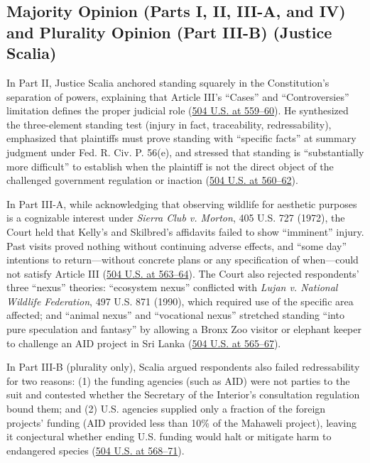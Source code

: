 \documentclass[12pt]{article}
\begin{document}
\subsection{Majority Opinion (Parts I, II, III-A, and IV) and Plurality Opinion (Part III-B) (Justice Scalia)}
In Part II, Justice Scalia anchored standing squarely in the Constitution's separation of powers, explaining that Article III's ``Cases'' and ``Controversies'' limitation defines the proper judicial role (\href{https://supreme.justia.com/cases/federal/us/504/555/}{504 U.S. at 559--60}). He synthesized the three-element standing test (injury in fact, traceability, redressability), emphasized that plaintiffs must prove standing with ``specific facts'' at summary judgment under Fed. R. Civ. P. 56(e), and stressed that standing is ``substantially more difficult'' to establish when the plaintiff is not the direct object of the challenged government regulation or inaction (\href{https://supreme.justia.com/cases/federal/us/504/555/}{504 U.S. at 560--62}).

In Part III-A, while acknowledging that observing wildlife for aesthetic purposes is a cognizable interest under \textit{Sierra Club v. Morton}, 405 U.S. 727 (1972), the Court held that Kelly's and Skilbred's affidavits failed to show ``imminent'' injury. Past visits proved nothing without continuing adverse effects, and ``some day'' intentions to return---without concrete plans or any specification of when---could not satisfy Article III (\href{https://supreme.justia.com/cases/federal/us/504/555/}{504 U.S. at 563--64}). The Court also rejected respondents' three ``nexus'' theories: ``ecosystem nexus'' conflicted with \textit{Lujan v. National Wildlife Federation}, 497 U.S. 871 (1990), which required use of the specific area affected; and ``animal nexus'' and ``vocational nexus'' stretched standing ``into pure speculation and fantasy'' by allowing a Bronx Zoo visitor or elephant keeper to challenge an AID project in Sri Lanka (\href{https://supreme.justia.com/cases/federal/us/504/555/}{504 U.S. at 565--67}).

In Part III-B (plurality only), Scalia argued respondents also failed redressability for two reasons: (1) the funding agencies (such as AID) were not parties to the suit and contested whether the Secretary of the Interior's consultation regulation bound them; and (2) U.S. agencies supplied only a fraction of the foreign projects' funding (AID provided less than 10\% of the Mahaweli project), leaving it conjectural whether ending U.S. funding would halt or mitigate harm to endangered species (\href{https://supreme.justia.com/cases/federal/us/504/555/}{504 U.S. at 568--71}).
\end{document}
